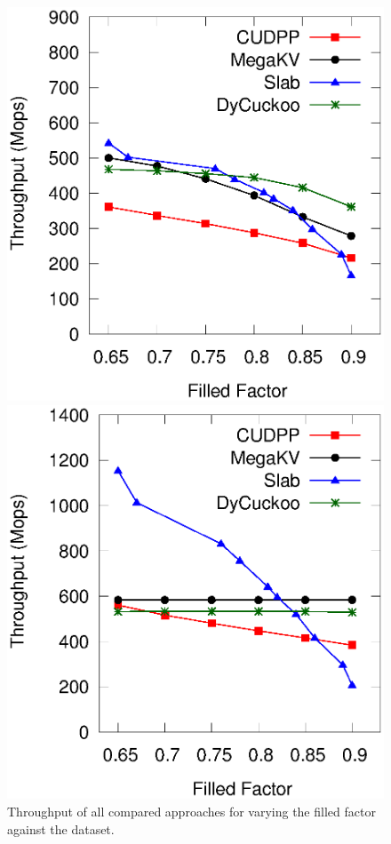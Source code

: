%
\begin{figure}[t]
	\begin{minipage}{0.48\linewidth}\centering
		\includegraphics[width=\linewidth]{pic/static-load_factor/insert.eps}
		\centerline{}
	\end{minipage}
	\hfill
	\begin{minipage}{0.48\linewidth}\centering
		\includegraphics[width=\linewidth]{pic/static-load_factor/search.eps}
		\centerline{}
	\end{minipage}
	\caption{Throughput of all compared approaches for varying the filled factor against the \dsali dataset.}
	\label{fig:static-filled-factor}
\end{figure}

